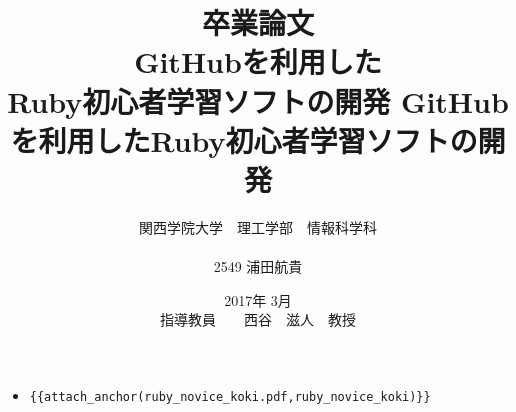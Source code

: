 \documentclass[12pt,a4paper]{jsarticle}
\begin{document}
\title{卒業論文\\
\vspace{4cm} GitHubを利用した\\Ruby初心者学習ソフトの開発}
\author{ 関西学院大学　理工学部　情報科学科\\\\2549 浦田航貴}
\date{\vspace{3cm} 2017年  3月\\
\vspace{3cm} 指導教員　　西谷　滋人　教授}
\maketitle
\tableofcontents

\title{ GitHubを利用したRuby初心者学習ソフトの開発}
\date{}
\maketitle
\begin{itemize}
\item \verb|{{attach_anchor(ruby_novice_koki.pdf,ruby_novice_koki)}}|
\end{itemize}






\end{document}

